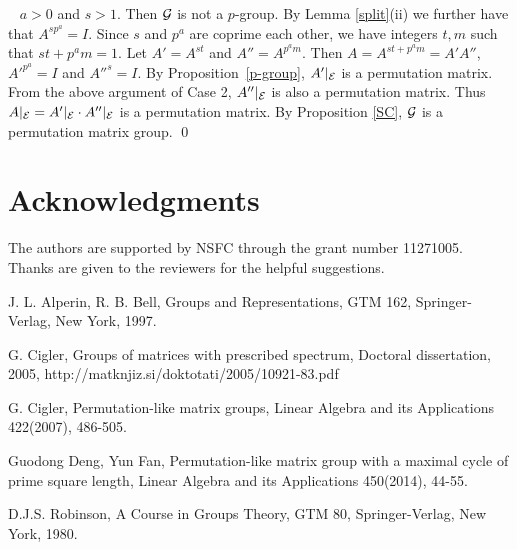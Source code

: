 \documentclass{article}
\numberwithin{equation}{section}
\begin{document}
~ $a>0$ and $s>1$.
Then ${\cal G}$ is not a $p$-group.
By Lemma \ref{split}(ii) we further have that $A^{sp^a}=I$.
Since $s$ and $p^a$ are coprime each other, we have integers
$t,m$ such that $st+p^a m=1$.
Let $A'=A^{st}$ and $A''=A^{p^am}$.
Then $A=A^{st+p^a m}=A'A''$, ${A'}^{p^a}=I$ and ${A''}^s=I$.
By Proposition~\ref{p-group}, $A'|_{\cal E}$ is a permutation matrix.
From the above argument of Case 2, $A''|_{\cal E}$ is also a permutation matrix.
Thus $A|_{\cal E}=A'|_{\cal E}\cdot A''|_{\cal E}$ is a permutation matrix.
By Proposition \ref{SC}, ${\cal G}$ is a permutation matrix group.
\qed

\section*{Acknowledgments}

The authors are supported by NSFC through the grant number 11271005.
Thanks are given to the reviewers for the helpful suggestions.


\begin{thebibliography}{99}

J. L. Alperin, R. B. Bell, Groups and Representations,
GTM 162, Springer-Verlag, New York,  1997.


 G. Cigler, Groups of matrices with prescribed spectrum,
Doctoral dissertation, 2005,
http://matknjiz.si/doktotati/2005/10921-83.pdf

 G. Cigler, Permutation-like matrix groups, Linear Algebra and its
Applications 422(2007), 486-505.

 Guodong Deng, Yun Fan, Permutation-like
matrix group with a maximal cycle of prime square length,
Linear Algebra and its Applications 450(2014), 44-55.

 D.J.S. Robinson, A Course in Groups Theory,
GTM 80, Springer-Verlag, New York,  1980.

\end{thebibliography}
\end{document}

